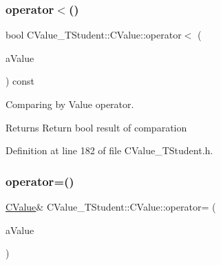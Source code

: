 \mbox{\label{class_c_value___t_student_1_1_c_value_a616db0b5d1db68fef3d0cdfb382e37c4}} 
\subsubsection{\texorpdfstring{operator$<$()}{operator<()}}
{\footnotesize\ttfamily bool C\+Value\+\_\+\+T\+Student\+::\+C\+Value\+::operator$<$ (\begin{DoxyParamCaption}\item[{const \hyperlink{class_c_value___t_student_1_1_c_value}{C\+Value} \&}]{a\+Value }\end{DoxyParamCaption}) const\hspace{0.3cm}{\ttfamily [inline]}}



Comparing by Value operator. 

\begin{DoxyReturn}{Returns}
Return {\ttfamily bool} result of comparation 
\end{DoxyReturn}


Definition at line 182 of file C\+Value\+\_\+\+T\+Student.\+h.

\mbox{\label{class_c_value___t_student_1_1_c_value_a837c1a449684ebdb0235449f214deb9d}} 
\subsubsection{\texorpdfstring{operator=()}{operator=()}}
{\footnotesize\ttfamily \hyperlink{class_c_value___t_student_1_1_c_value}{C\+Value}\& C\+Value\+\_\+\+T\+Student\+::\+C\+Value\+::operator= (\begin{DoxyParamCaption}\item[{const \hyperlink{class_c_value___t_student_1_1_c_value}{C\+Value} \&}]{a\+Value }\end{DoxyParamCaption})\hspace{0.3cm}{\ttfamily [inline]}}




